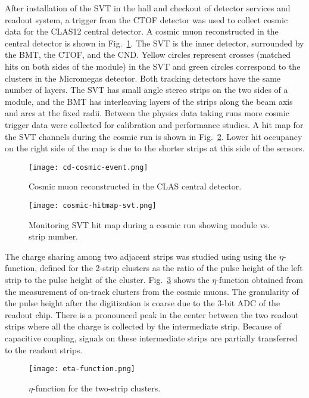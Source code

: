 After installation of the SVT in the hall and checkout of detector services and readout system, a trigger from the CTOF detector was used to collect cosmic data for the CLAS12 central detector. A cosmic muon reconstructed in the central detector is shown in Fig.~\ref{fig:cd-cosmic-event}. The SVT is the inner detector, surrounded by the BMT, the CTOF, and the CND. Yellow circles represent crosses (matched hits on both sides of the module) in the SVT and green circles correspond to the clusters in the Micromegas detector. Both tracking detectors have the same number of layers. The SVT has small angle stereo strips on the two sides of a module, and the BMT has interleaving layers of the strips along the beam axis and arcs at the fixed radii. Between the physics data taking runs more cosmic trigger data were collected for calibration and performance studies.  A hit map for the SVT channels during the cosmic run is shown in Fig.~\ref{fig:cosmic-hitmap-svt}. Lower hit occupancy on the right side of the map is due to the shorter strips at this side of the sensors. 

\begin{figure}[hbt] 
\centering 
\texttt{[image: cd-cosmic-event.png]}
\caption{Cosmic muon reconstructed in the CLAS central detector.}
\label{fig:cd-cosmic-event}
\end{figure}

\begin{figure}[hbt] 
\centering 
\texttt{[image: cosmic-hitmap-svt.png]}
\caption{Monitoring SVT hit map during a cosmic run showing module vs. strip number.}
\label{fig:cosmic-hitmap-svt}
\end{figure}

The charge sharing among two adjacent strips was studied using using the $\eta$-function, defined for the 2-strip clusters as the ratio of the pulse height of the left strip to the pulse height of the cluster. Fig.~\ref{fig:eta-function} shows the  $\eta$-function obtained from the measurement of on-track clusters from the cosmic muons. The granularity of the pulse height after the digitization is coarse due to the 3-bit ADC of the readout chip. There is a pronounced peak in the center between the two readout strips where all the charge is collected by the intermediate strip. Because of capacitive coupling, signals on these intermediate strips are partially transferred to the readout strips.

\begin{figure}[hbt] 
\centering 
\texttt{[image: eta-function.png]}
\caption{$\eta$-function for the two-strip clusters.}
\label{fig:eta-function}
\end{figure}

